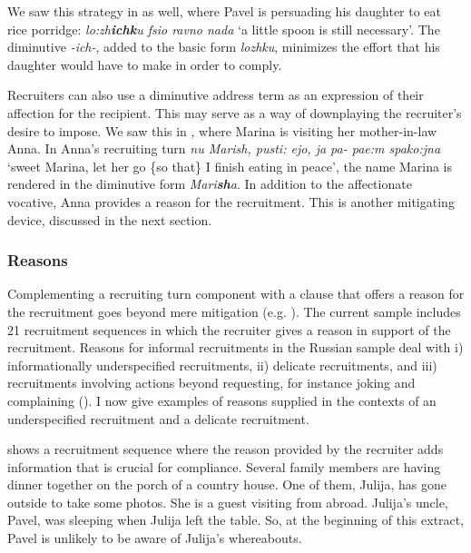 \documentclass[output=paper,modfonts,nonflat]{langsci/langscibook}
\begin{document}
We saw this strategy in  as well, where Pavel is persuading his daughter to eat rice porridge: \textit{lo:zh}\textbf{\textit{ichk}}\textit{u fsio ravno nada} ‘a little spoon is still necessary'. The diminutive \textit{-ich-}, added to the basic form \textit{lozhku}, minimizes the effort that his daughter would have to make in order to comply. %

Recruiters can also use a diminutive address term as an expression of their affection for the recipient. This may serve as a way of downplaying the recruiter’s desire to impose. We saw this in , where Marina is visiting her mother-in-law Anna. In Anna's recruiting turn \textit{nu Marish, pusti: ejo, ja pa- pae:m spako:jna} ‘sweet Marina, let her go \{so that\} I finish eating in peace’, the name Marina is rendered in the diminutive form \textit{Mari}\textbf{\textit{sh}}\textit{a}. In addition to the affectionate vocative, Anna provides a reason for the recruitment. This is another mitigating device, discussed in the next section. %

\subsubsection{Reasons}\label{sec:baranova:3.4.2}

Complementing a recruiting turn component with a clause that offers a reason for the recruitment goes beyond mere mitigation (e.g. \citealt{Waring2007,Parry2013}). The current sample includes 21 recruitment sequences in which the recruiter gives a reason in support of the recruitment. Reasons for informal recruitments in the Russian sample deal with i) informationally underspecified recruitments, ii) delicate recruitments, and iii) recruitments involving actions beyond requesting, for instance joking and complaining (\citealt{BaranovaDingemanse2016}). I now give examples of reasons supplied in the contexts of an underspecified recruitment and a delicate recruitment.

 shows a recruitment sequence where the reason provided by the recruiter adds information that is crucial for compliance. Several family members are having dinner together on the porch of a country house. One of them, Julija, has gone outside to take some photos. She is a guest visiting from abroad. Julija’s uncle, Pavel, was sleeping when Julija left the table. So, at the beginning of this extract, Pavel is unlikely to be aware of Julija’s whereabouts.
\end{document}
